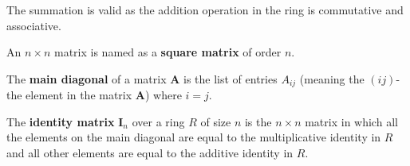 \documentclass[12pt, letterpaper]{article}
\newcommand{\idm}{\mathbf{I}}
\theoremstyle{definition}
\theoremstyle{remark}
\theoremstyle{definition}
\theoremstyle{plain}
\numberwithin{equation}{section}
\begin{document}
	The summation is valid as the addition operation in the ring is commutative and associative.
	
	\begin{def*}
		An $n\times n$ matrix is named as a \textbf{square matrix} of order $n$.
	\end{def*}

	\begin{def*}
		The \textbf{main diagonal} of a matrix $\mathbf{A}$ is the list of entries $A_{ij}$ (meaning the $(ij)$-the element in the matrix $\mathbf{A}$) where $i=j$.
	\end{def*}

	\begin{def*}
		The \textbf{identity matrix} $\idm_{n}$ over a ring $R$ of size $n$ is the $n\times n$ matrix in which all the elements on the main diagonal are equal to the multiplicative identity in $R$ and all other elements are equal to the additive identity in $R$.
	\end{def*}
	
\end{document}

